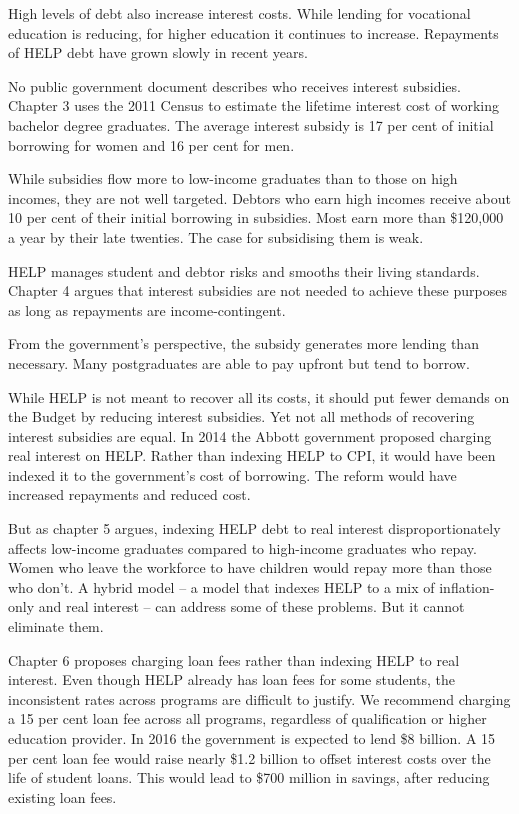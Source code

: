\documentclass[embargoed]{grattan}
\begin{document}
High levels of debt also increase interest costs.
While lending for vocational education is reducing, for higher education it continues to increase.
Repayments of HELP debt have grown slowly in recent years.

No public government document describes who receives interest subsidies.
Chapter 3 uses the 2011 Census to estimate the lifetime interest cost of working bachelor degree graduates.
The average interest subsidy is 17 per cent of initial borrowing for women and 16 per cent for men.

While subsidies flow more to low-income graduates than to those on high incomes, they are not well targeted.
Debtors who earn high incomes receive about 10 per cent of their initial borrowing in subsidies.
Most earn more than \$120,000 a year by their late twenties.
The case for subsidising them is weak.

HELP manages student and debtor risks and smooths their living standards.
Chapter 4 argues that interest subsidies are not needed to achieve these purposes as long as repayments are income-contingent.

From the government's perspective, the subsidy generates more lending than necessary.
Many postgraduates are able to pay upfront but tend to borrow.

While HELP is not meant to recover all its costs, it should put fewer demands on the Budget by reducing interest subsidies.
Yet not all methods of recovering interest subsidies are equal.
In 2014 the Abbott government proposed charging real interest on HELP.
Rather than indexing HELP to \gls{CPI}, it would have been indexed it to the government's cost of borrowing.
The reform would have increased repayments and reduced cost.

But as chapter 5 argues, indexing HELP debt to real interest disproportionately affects low-income graduates compared to high-income graduates who repay.
Women who leave the workforce to have children would repay more than those who don't.
A hybrid model -- a model that indexes HELP to a mix of inflation-only and real interest -- can address some of these problems.
But it cannot eliminate them.

Chapter 6 proposes charging loan fees rather than indexing HELP to real interest.
Even though HELP already has loan fees for some students, the inconsistent rates across programs are difficult to justify.
We recommend charging a 15 per cent loan fee across all programs, regardless of qualification or higher education provider.
In 2016 the government is expected to lend \$8 billion.
A 15 per cent loan fee would raise nearly \$1.2 billion to offset interest costs over the life of student loans.
This would lead to \$700 million in savings, after reducing existing loan fees.
\end{document}
